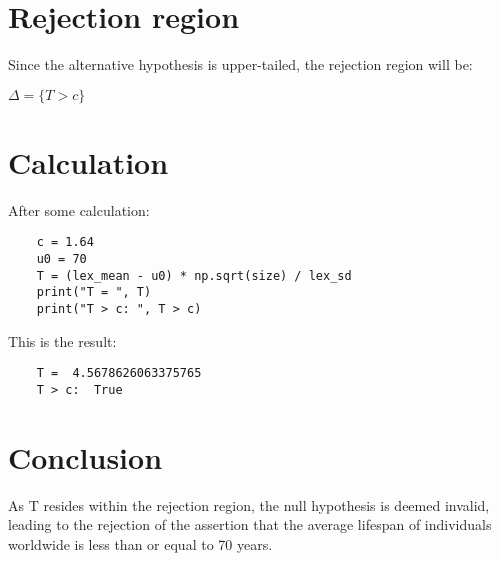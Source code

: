 \section{Rejection region}
Since the alternative hypothesis is upper-tailed, the rejection region will be:
\begin{center}
    {\fontsize{16}{20}\selectfont $\Delta = \{T > c\}$}
\end{center}

\section{Calculation}
After some calculation:
\begin{verbatim}
    c = 1.64
    u0 = 70
    T = (lex_mean - u0) * np.sqrt(size) / lex_sd
    print("T = ", T)
    print("T > c: ", T > c)
\end{verbatim}

This is the result:
\begin{verbatim}
    T =  4.5678626063375765
    T > c:  True
\end{verbatim}

\section{Conclusion}
As T resides within the rejection region, the null hypothesis is deemed invalid, leading to the rejection of the assertion that the average lifespan of individuals worldwide is less than or equal to 70 years.